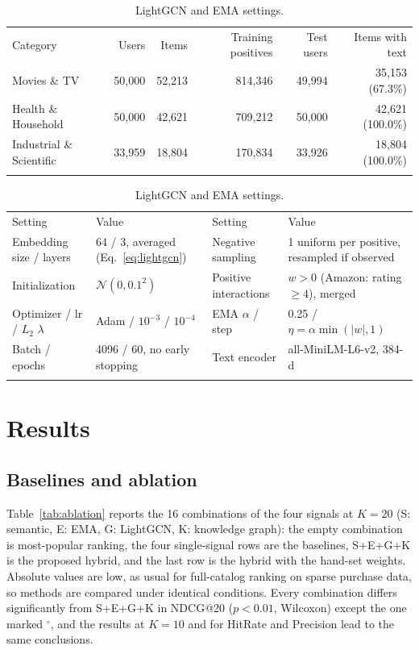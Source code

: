\documentclass[3p,times,procedia]{elsarticle}
\begin{document}
\begin{table}[!ht]
\centering
\caption{Benchmark graphs after filtering.}
\label{tab:datasets}
\footnotesize
\begin{tabular*}{\hsize}{@{\extracolsep{\fill}}lrrrrr@{}}
\toprule
Category & Users & Items & Training positives & Test users & Items with text \\
\colrule
Movies \& TV & 50,000 & 52,213 & 814,346 & 49,994 & 35,153 (67.3\%) \\
Health \& Household & 50,000 & 42,621 & 709,212 & 50,000 & 42,621 (100.0\%) \\
Industrial \& Scientific & 33,959 & 18,804 & 170,834 & 33,926 & 18,804 (100.0\%) \\
\botrule
\end{tabular*}
\caption{LightGCN and EMA settings.}
\label{tab:settings}
\footnotesize
\begin{tabular*}{\hsize}{@{\extracolsep{\fill}}llll@{}}
\toprule
Setting & Value & Setting & Value \\
\colrule
Embedding size / layers & 64 / 3, averaged (Eq.~\eqref{eq:lightgcn}) & Negative sampling & 1 uniform per positive, resampled if observed \\
Initialization & $\mathcal{N}(0,0.1^2)$ & Positive interactions & $w>0$ (Amazon: rating $\geq 4$), merged \\
Optimizer / lr / $L_2$ $\lambda$ & Adam / $10^{-3}$ / $10^{-4}$ & EMA $\alpha$ / step & 0.25 / $\eta=\alpha\min(|w|,1)$ \\
Batch / epochs & 4096 / 60, no early stopping & Text encoder & all-MiniLM-L6-v2, 384-d \\
\botrule
\end{tabular*}
\end{table}

\section{Results}
\label{sec:results}
\subsection{Baselines and ablation}
\label{sec:ablation}
Table~\ref{tab:ablation} reports the 16 combinations of the four signals at $K=20$ (S: semantic, E: EMA, G: LightGCN, K: knowledge graph): the empty combination is most-popular ranking, the four single-signal rows are the baselines, S+E+G+K is the proposed hybrid, and the last row is the hybrid with the hand-set weights. Absolute values are low, as usual for full-catalog ranking on sparse purchase data, so methods are compared under identical conditions. Every combination differs significantly from S+E+G+K in NDCG@20 ($p<0.01$, Wilcoxon) except the one marked $^{\circ}$, and the results at $K=10$ and for HitRate and Precision lead to the same conclusions.
\end{document}
